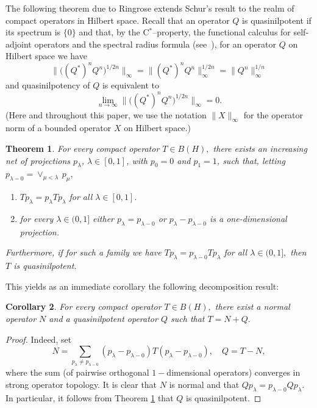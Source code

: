 \documentclass{amsart}
\theoremstyle{plain}
\newtheorem{thm}{Theorem}
\newtheorem{cor}[thm]{Corollary}
\theoremstyle{remark}
\begin{document}
The following theorem due to Ringrose \cite{Ringrose} extends Schur's result to the realm of compact operators in Hilbert space. 
Recall that an operator $Q$ is quasinilpotent if its spectrum is $\{0\}$
and that, by the C$^*$--property, the functional calculus for self-adjoint operators and the spectral radius formula
 (see~\cite{KR1}),
for an operator $Q$ on Hilbert space we have 
\[
\|\big((Q^*)^nQ^n\big)^{1/2n}\|_\infty=\|(Q^*)^nQ^n\|_\infty^{1/2n}=\|Q^n\|_\infty^{1/n}
\]
and quasinilpotency of $Q$
is equivalent to
\begin{equation}\label{eq:Q*nQn}
\lim_{n\to\infty}\|\big((Q^*)^nQ^n)^{1/2n}\|_{\infty}=0.
\end{equation}
(Here and throughout this paper, we use the notation $\|X\|_\infty$ for the operator norm of a bounded operator $X$ on Hilbert space.)

\begin{thm}\label{ringrose} For every compact operator $T\in B(H),$ there exists an increasing net of projections $p_{\lambda}$,
$\lambda\in[0,1]$, with $p_0=0$ and $p_1=1$, such that, letting $p_{\lambda-0}=\vee_{\mu<\lambda}\,p_\mu,$
\begin{enumerate}[{\rm (a)}]
\item\label{rina} $Tp_{\lambda}=p_{\lambda}Tp_{\lambda}$ for all $\lambda\in[0,1].$
\item\label{rinb} for every $\lambda\in(0,1]$ either $p_{\lambda}=p_{\lambda-0}$ or $p_{\lambda}-p_{\lambda-0}$ is a one-dimensional projection.
\end{enumerate}
Furthermore, if for such a family we have $Tp_{\lambda}=p_{\lambda-0}Tp_{\lambda}$ for all $\lambda\in(0,1],$ then $T$ is quasinilpotent.
\end{thm}

This yields as an immediate corollary the following decomposition result:

\begin{cor}\label{cor:ringrose} For every compact operator $T\in B(H),$ there exist a normal operator $N$ and a quasinilpotent operator $Q$ such that $T=N+Q.$
\end{cor}
\begin{proof} Indeed, set
$$N=\sum_{p_{\lambda}\neq p_{\lambda-0}}(p_{\lambda}-p_{\lambda-0})T(p_{\lambda}-p_{\lambda-0}),\quad Q=T-N,$$
where the sum (of pairwise orthogonal $1-$dimensional operators)  converges in strong operator topology.
It is clear that $N$ is normal and that $Qp_{\lambda}=p_{\lambda-0}Qp_{\lambda}.$ In particular, it follows from Theorem \ref{ringrose} that $Q$ is quasinilpotent.
\end{proof}
\end{document}
